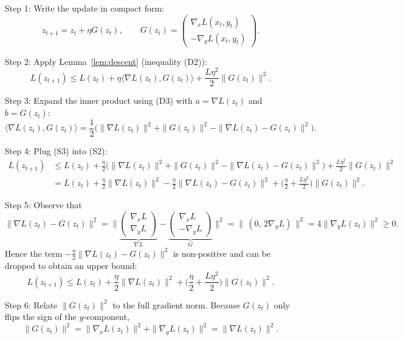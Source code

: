 \documentclass{article}
\begin{document}
\begin{enumerate}
\item[Step 1:]  Write the update in compact form:
\[
z_{t+1}=z_t+\eta G(z_t),\qquad 
G(z_t)=\begin{pmatrix}\nabla_x L(x_t,y_t)\\ -\nabla_y L(x_t,y_t)\end{pmatrix}.
\]

\item[Step 2:]  Apply Lemma~\ref{lem:descent} (inequality (D2)):
\[
L(z_{t+1})\le L(z_t)+\eta\langle\nabla L(z_t),G(z_t)\rangle
+\frac{L\eta^{2}}{2}\|G(z_t)\|^{2}. \tag{S2}
\]

\item[Step 3:]  Expand the inner product using (D3) with
$a=\nabla L(z_t)$ and $b=G(z_t)$:
\[
\langle\nabla L(z_t),G(z_t)\rangle
=\frac12\Big(\|\nabla L(z_t)\|^{2}+\|G(z_t)\|^{2}
-\|\nabla L(z_t)-G(z_t)\|^{2}\Big). \tag{S3}
\]

\item[Step 4:]  Plug (S3) into (S2):
\[
\begin{aligned}
L(z_{t+1}) &\le L(z_t)
+\frac{\eta}{2}\Big(\|\nabla L(z_t)\|^{2}+\|G(z_t)\|^{2}
-\|\nabla L(z_t)-G(z_t)\|^{2}\Big)
+\frac{L\eta^{2}}{2}\|G(z_t)\|^{2}  \\
&= L(z_t)
+\frac{\eta}{2}\|\nabla L(z_t)\|^{2}
-\frac{\eta}{2}\|\nabla L(z_t)-G(z_t)\|^{2}
+\Big(\frac{\eta}{2}+ \frac{L\eta^{2}}{2}\Big)\|G(z_t)\|^{2}. \tag{S4}
\end{aligned}
\]

\item[Step 5:]  Observe that
\[
\|\nabla L(z_t)-G(z_t)\|^{2}
= \big\|\underbrace{\begin{pmatrix}\nabla_x L\\ \nabla_y L\end{pmatrix}}_{\nabla L}
-
\underbrace{\begin{pmatrix}\nabla_x L\\ -\nabla_y L\end{pmatrix}}_{G}\big\|^{2}
= \|\, (0,\,2\nabla_y L)\,\|^{2}=4\|\nabla_y L(z_t)\|^{2}\ge0.
\]
Hence the term $-\frac{\eta}{2}\|\nabla L(z_t)-G(z_t)\|^{2}$ is non‑positive and can be dropped to obtain an upper bound:
\[
L(z_{t+1})\le L(z_t)
+\frac{\eta}{2}\|\nabla L(z_t)\|^{2}
+\Big(\frac{\eta}{2}+ \frac{L\eta^{2}}{2}\Big)\|G(z_t)\|^{2}. \tag{S5}
\]

\item[Step 6:]  Relate $\|G(z_t)\|^{2}$ to the full gradient norm.
Because $G(z_t)$ only flips the sign of the $y$‑component,
\[
\|G(z_t)\|^{2}= \|\nabla_x L(z_t)\|^{2}+ \|\nabla_y L(z_t)\|^{2}
= \|\nabla L(z_t)\|^{2}. \tag{S6}
\]


\end{enumerate}
\end{document}
